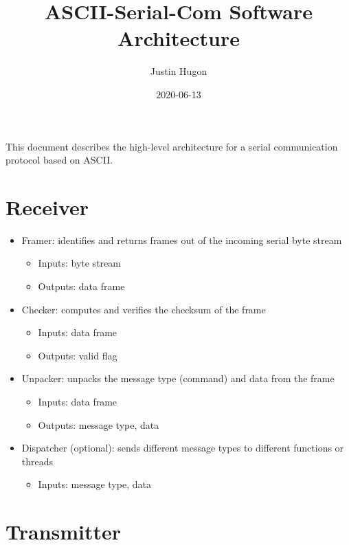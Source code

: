 \documentclass{customdocclass}
\title{ASCII-Serial-Com Software Architecture}
\author{Justin Hugon}
\date{2020-06-13}
\begin{document}
\maketitle

This document describes the high-level architecture for a serial communication
protocol based on ASCII.

\section{Receiver}

\begin{itemize}
  \item Framer: identifies and returns frames out of the incoming serial byte stream
  \begin{itemize}
    \item Inputs: byte stream
    \item Outputs: data frame
  \end{itemize}
  \item Checker: computes and verifies the checksum of the frame
  \begin{itemize}
    \item Inputs: data frame
    \item Outputs: valid flag
  \end{itemize}
  \item Unpacker: unpacks the message type (command) and data from the frame
  \begin{itemize}
    \item Inputs: data frame
    \item Outputs: message type, data
  \end{itemize}
  \item Dispatcher (optional): sends different message types to different functions or threads
  \begin{itemize}
    \item Inputs: message type, data
  \end{itemize}
\end{itemize}

\section{Transmitter}
\end{document}
